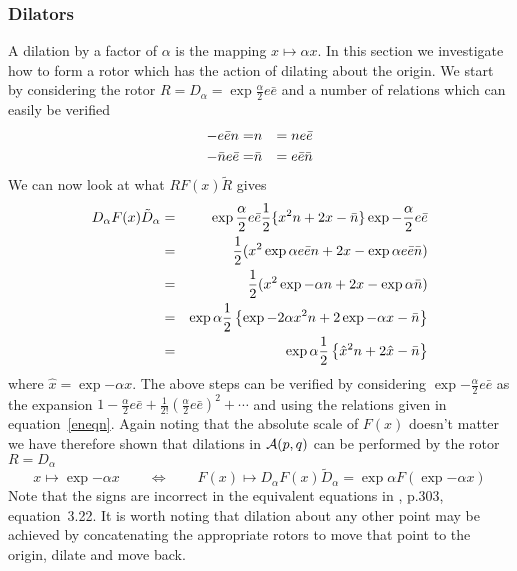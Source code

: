 \subsubsection{Dilators}


A dilation by a factor of $\alpha$ is the mapping
$x \mapsto \alpha x$. In this section we investigate how
to form a rotor which has the action of dilating about the
origin. We start by considering the rotor $R = D_{\alpha} =
\exp{\frac{\alpha}{2}e\bar{e}}$ and a number of
relations which can easily be verified
%
\begin{eqnarray}
   -e\bar{e}n  = &  {n} & = ne\bar{e}  \nonumber \\
   -\bar{n}e\bar{e} = &  \bar{n} & =  e\bar{e}\bar{n}  \label{eneqn}
\end{eqnarray}
%
We can now look at what $RF(x)\tilde{R}$ gives
%
\begin{eqnarray}
D_\alpha F(x) \tilde{D}_\alpha & = & \exp{\frac{\alpha}{2}e\bar{e}}\frac{1}{2}\{ x^2n + 2x - \bar{n}\}\exp{-\frac{\alpha}{2}e\bar{e}} \nonumber \\
   &  =  &  \frac{1}{2}(x^2  \exp{\alpha e\bar{e}}n + 2x - \exp{\alpha e\bar{e}}\bar{n}) \nonumber \\
   & = &  \frac{1}{2}(x^2 \exp{-\alpha} n + 2x - \exp{\alpha}\bar{n}) \nonumber \\
   & = & \exp{\alpha}\frac{1}{2}\left\{\exp{-2\alpha}x^2n + 2\exp{-\alpha}x - \bar{n}\right\} \nonumber \\
   & = & \exp{\alpha}\frac{1}{2}\left\{\hat{x}^2n + 2\hat{x} -\bar{n}\right\}
\label{Deqn}
\end{eqnarray}
%
where $\hat{x} = \exp{-\alpha}x$. The above steps can be
verified by considering $\exp{-\frac{\alpha}{2}e\bar{e}}$ as
the expansion $1 - \frac{\alpha}{2}e\bar{e} +
\frac{1}{2!}\left(\frac{\alpha}{2}e\bar{e}\right)^2 +
\cdots$ and using the relations given in
equation~\ref{eneqn}.
Again noting that the absolute scale of $F(x)$ doesn't matter we
have therefore shown that dilations  in ${\mathcal{A}}(p,q)$ can be performed by
the rotor    $R=D_\alpha$
 \begin{equation}
x \mapsto \exp{-\alpha}x \qquad \Leftrightarrow \qquad F(x)
\mapsto  D_{\alpha} F(x) \tilde{D}_{\alpha} =
\exp{\alpha}F(\exp{-\alpha}x)
\end{equation}
%
Note that the signs are incorrect in the equivalent
equations in \cite{HS84}, p.303, equation~3.22. It is worth noting
that dilation about any other point may be achieved by concatenating the
appropriate rotors to move that point to the origin, dilate and move back.


